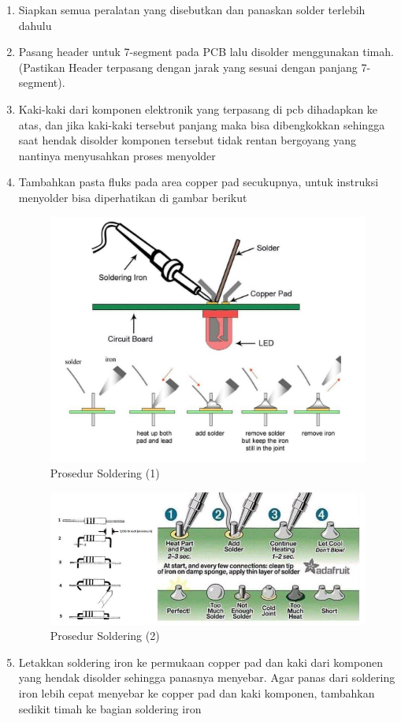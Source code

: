 \begin{enumerate}
    \item Siapkan semua peralatan yang disebutkan dan panaskan solder terlebih dahulu
    \item Pasang header untuk 7-segment pada PCB lalu disolder menggunakan timah. (Pastikan Header terpasang dengan jarak yang sesuai dengan panjang 7-segment).
    \item Kaki-kaki dari komponen  elektronik yang terpasang di pcb dihadapkan ke atas, dan jika kaki-kaki tersebut panjang maka bisa dibengkokkan sehingga saat hendak disolder komponen tersebut tidak rentan bergoyang yang nantinya menyusahkan proses menyolder
    \item Tambahkan pasta fluks pada area copper pad secukupnya, untuk instruksi menyolder bisa diperhatikan di gambar berikut
        \begin{figure}[H]
            \centering
            \includegraphics[width=0.6\linewidth]{P2/img/solder1.png}
            \caption{Prosedur Soldering (1)}
            \label{fig:ProsedurSoldering1}
        \end{figure}
        \begin{figure}[H]
            \centering
            \includegraphics[width=0.8\linewidth]{P2/img/solder2.png}
            \caption{Prosedur Soldering (2)}
            \label{fig:ProsedurSoldering2}
        \end{figure}
    \item Letakkan soldering iron ke permukaan copper pad dan kaki dari komponen yang hendak disolder sehingga panasnya menyebar. Agar panas dari soldering iron lebih cepat menyebar ke copper pad dan kaki komponen, tambahkan sedikit timah ke bagian soldering iron 

\end{enumerate}
